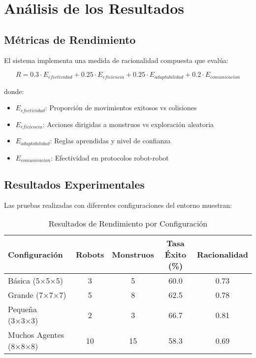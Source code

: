 \documentclass[10pt,twocolumn]{article}
\begin{document}
\section{Análisis de los Resultados}

\subsection{Métricas de Rendimiento}

El sistema implementa una medida de racionalidad compuesta que evalúa:

\begin{equation}
R = 0.3 \cdot E_{efectividad} + 0.25 \cdot E_{eficiencia} + 0.25 \cdot E_{adaptabilidad} + 0.2 \cdot E_{comunicacion}
\end{equation}

donde:
\begin{itemize}
\item $E_{efectividad}$: Proporción de movimientos exitosos vs colisiones
\item $E_{eficiencia}$: Acciones dirigidas a monstruos vs exploración aleatoria
\item $E_{adaptabilidad}$: Reglas aprendidas y nivel de confianza
\item $E_{comunicacion}$: Efectividad en protocolos robot-robot
\end{itemize}

\subsection{Resultados Experimentales}

Las pruebas realizadas con diferentes configuraciones del entorno muestran:

\begin{table}[H]
\centering
\caption{Resultados de Rendimiento por Configuración}
\begin{tabular}{@{}lcccc@{}}
\toprule
Configuración & Robots & Monstruos & Tasa Éxito (\%) & Racionalidad \\
\midrule
Básica (5×5×5) & 3 & 5 & 60.0 & 0.73 \\
Grande (7×7×7) & 5 & 8 & 62.5 & 0.78 \\
Pequeña (3×3×3) & 2 & 3 & 66.7 & 0.81 \\
Muchos Agentes (8×8×8) & 10 & 15 & 58.3 & 0.69 \\
\bottomrule
\end{tabular}
\end{table}
\end{document}
